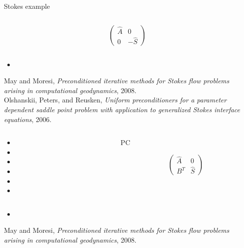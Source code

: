 \begin{frame}[fragile]{Stokes example}
\begin{overprint}
\begin{columns}
\begin{column}[t]{0.33\textwidth}
\begin{equation*}
\begin{pmatrix}
\hat A & 0 \\
    0  & -\hat S
\end{pmatrix}
\end{equation*}
\end{column}
\end{columns}
\begin{itemize}
  \item[] 
\end{itemize}
\scriptsize
  May and Moresi, \emph{Preconditioned iterative methods for Stokes flow problems arising in computational geodynamics}, 2008.\\
  Olshanskii, Peters, and Reusken, \emph{Uniform preconditioners for a parameter dependent saddle point problem with application to generalized Stokes interface equations}, 2006.
%
\begin{columns}
\begin{column}[t]{0.67\textwidth}
\begin{itemize}
  \item[] 
  \item[] 
  \medskip
  \item[] 
  \item[] 
  \medskip
  \item[] 
  \item[] 
\end{itemize}
\end{column}
\begin{column}[t]{0.33\textwidth}
\Huge\begin{center}PC\end{center}
\begin{equation*}
\begin{pmatrix}
\hat A  & 0 \\
    B^T & \hat S
\end{pmatrix}
\end{equation*}
\end{column}
\end{columns}
\begin{itemize}
  \item[] 
\end{itemize}
\scriptsize
  May and Moresi, \emph{Preconditioned iterative methods for Stokes flow problems arising in computational geodynamics}, 2008.

\end{overprint}
\end{frame}

